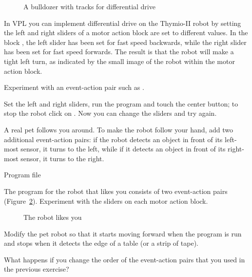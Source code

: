 \begin{figure}
\begin{center}
\caption{A bulldozer with tracks for differential drive}\label{fig.bull}
\end{center}
\end{figure}

In VPL you can implement differential drive on the Thymio-II robot by
setting the left and right sliders of a motor action block are set to
different values. In the block , the left slider has
been set for fast speed backwards, while the right slider has been set
for fast speed forwards. The result is that the robot will make a tight
left turn, as indicated by the small image of the robot within the motor
action block.

Experiment with an event-action pair such as .

Set the left and right sliders, run the program
and touch the center button; to stop the robot click on .
Now you can change the sliders and try again.



A real pet follows you around. To make the robot follow your hand, add
two additional event-action pairs: if the robot detects an object in
front of its left-most sensor, it turns to the left, while if it detects
an object in front of its right-most sensor, it turns to the right.

{\raggedleft \hfill Program file }

The program for the robot that likes you consists of two event-action
pairs (Figure~\ref{fig.likes}). Experiment with the sliders on each
motor action block.

\begin{figure}
\begin{center}
\caption{The robot likes you}\label{fig.likes}
\end{center}
\end{figure}


Modify the pet robot so that it starts moving forward when the program
is run and stops when it detects the edge of a table (or a strip of
tape).


What happens if you change the order of
the event-action pairs that you used in the previous exercise?


